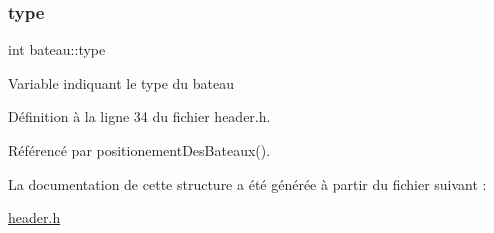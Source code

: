 \subsubsection{\texorpdfstring{type}{type}}
{\footnotesize\ttfamily int bateau\+::type}

Variable indiquant le type du bateau 

Définition à la ligne 34 du fichier header.\+h.



Référencé par positionement\+Des\+Bateaux().



La documentation de cette structure a été générée à partir du fichier suivant \+:\begin{DoxyCompactItemize}
\item 
\mbox{\hyperlink{header_8h}{header.\+h}}\end{DoxyCompactItemize}
